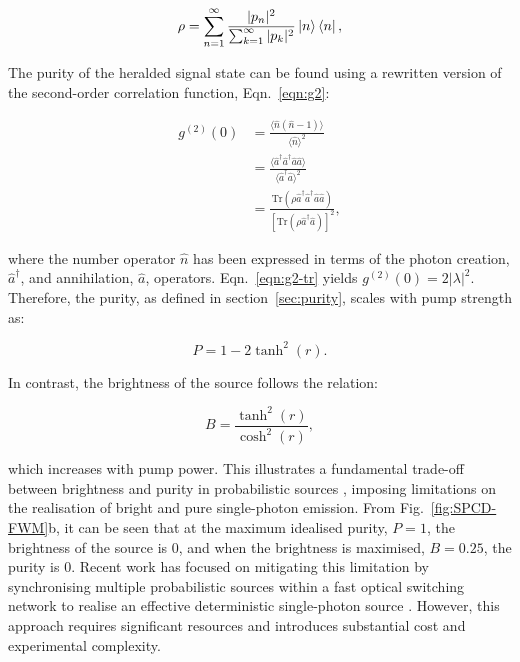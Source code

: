 \begin{equation}
    \rho = \sum_{n=1}^{\infty} \frac{|p_n|^2}{\sum_{k=1}^{\infty} |p_k|^2} \ket{n}\bra{n},
    \label{eqn:density_matrix_SPDC}
\end{equation}

The purity of the heralded signal state can be found using a rewritten version of the second-order correlation function, Eqn.~\ref{eqn:g2}:

\begin{equation}
\begin{aligned}
    g^{(2)}(0) &= \frac{\langle \hat{n}(\hat{n} - 1) \rangle}{\langle \hat{n} \rangle^2} \\
    &= \frac{\langle \hat{a}^\dagger \hat{a}^\dagger \hat{a} \hat{a} \rangle}{\langle \hat{a}^\dagger \hat{a} \rangle^2} \\
    &= \frac{\mathrm{Tr}(\rho \hat{a}^\dagger \hat{a}^\dagger \hat{a} \hat{a})}{\left[\mathrm{Tr}(\rho \hat{a}^\dagger \hat{a})\right]^2},
    \label{eqn:g2-tr}
\end{aligned}
\end{equation}

where the number operator $\hat{n}$ has been expressed in terms of the photon creation, $\hat{a}^\dagger$, and annihilation, $\hat{a}$, operators. Eqn.~\ref{eqn:g2-tr} yields $g^{(2)}(0) = 2|\lambda|^2$. Therefore, the purity, as defined in section~\ref{sec:purity}, scales with pump strength as:

\begin{equation}
    P = 1 - 2\tanh^2(r).
\end{equation}

In contrast, the brightness of the source follows the relation:

\begin{equation}
    B = \frac{\tanh^2(r)}{\cosh^2(r)},
\end{equation}

which increases with pump power. This illustrates a fundamental trade-off between brightness and purity in probabilistic sources \cite{Senellart2017}, imposing limitations on the realisation of bright and pure single-photon emission. From Fig.~\ref{fig:SPCD-FWM}b, it can be seen that at the maximum idealised purity, $P=1$, the brightness of the source is 0, and when the brightness is maximised, $B=0.25$, the purity is 0. Recent work has focused on mitigating this limitation by synchronising multiple probabilistic sources within a fast optical switching network to realise an effective deterministic single-photon source \cite{Meyer-Scott2020}. However, this approach requires significant resources and introduces substantial cost and experimental complexity.


